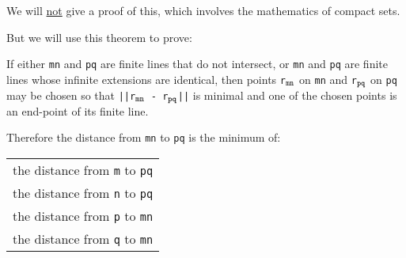 \documentclass[12pt]{article}
\begin{document}
We will \underline{not} give a proof of this,
which involves the mathematics of compact sets.

But we will use this theorem to prove:

\begin{theorem}
\label{FINITE-LINE-DISTANCE-THEOREM}
If either {\tt mn} and {\tt pq} are finite lines that do not intersect, or
{\tt mn} and {\tt pq} are finite lines whose infinite extensions are
identical, then
points {\tt r$_{\tt mn}$} on {\tt mn} and
{\tt r$_{\tt pq}$} on {\tt pq} may be chosen so that
{\tt ||r$_{\tt mn}$ - r$_{\tt pq}$||} is minimal and
one of the chosen points is an end-point of its finite line.

Therefore the distance from {\tt mn} to {\tt pq} is the
minimum of: \\
\hspace*{0.5in}\begin{tabular}{l}
the distance from {\tt m} to {\tt pq} \\
the distance from {\tt n} to {\tt pq} \\
the distance from {\tt p} to {\tt mn} \\
the distance from {\tt q} to {\tt mn} \\
\end{tabular}
\end{theorem}
\end{document}
